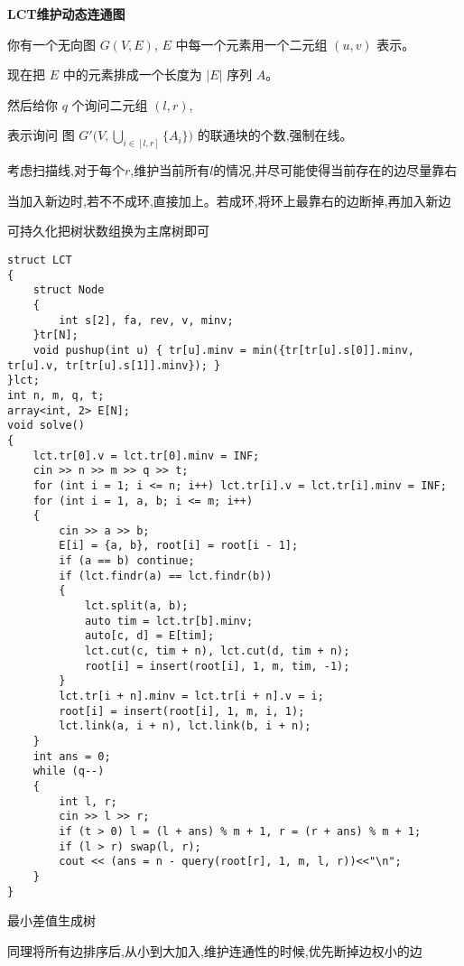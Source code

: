 \documentclass[a4paper,fontset=none]{ctexart}
\begin{document}
\textbf{LCT维护动态连通图}

你有一个无向图 $G( V, E )$, $E$ 中每一个元素用一个二元组 $( u, v )$ 表示。

现在把 $E$ 中的元素排成一个长度为 $|E|$ 序列 $A$。

然后给你 $q$ 个询问二元组 $( l, r )$,

表示询问 图 $ G'\big( V, \mathop{\bigcup}\limits_{ i \in [l, r] } \{A_i\} \big) $ 的联通块的个数,强制在线。

考虑扫描线,对于每个$r$,维护当前所有$l$的情况,并尽可能使得当前存在的边尽量靠右

当加入新边时,若不不成环,直接加上。若成环,将环上最靠右的边断掉,再加入新边

可持久化把树状数组换为主席树即可

\begin{verbatim}
struct LCT
{
    struct Node
    {
        int s[2], fa, rev, v, minv;
    }tr[N];
    void pushup(int u) { tr[u].minv = min({tr[tr[u].s[0]].minv, tr[u].v, tr[tr[u].s[1]].minv}); }
}lct;
int n, m, q, t;
array<int, 2> E[N];
void solve()
{
    lct.tr[0].v = lct.tr[0].minv = INF;
    cin >> n >> m >> q >> t;
    for (int i = 1; i <= n; i++) lct.tr[i].v = lct.tr[i].minv = INF;
    for (int i = 1, a, b; i <= m; i++)
    {
        cin >> a >> b;
        E[i] = {a, b}, root[i] = root[i - 1];
        if (a == b) continue;
        if (lct.findr(a) == lct.findr(b))
        {
            lct.split(a, b);
            auto tim = lct.tr[b].minv;
            auto[c, d] = E[tim];
            lct.cut(c, tim + n), lct.cut(d, tim + n);
            root[i] = insert(root[i], 1, m, tim, -1);
        }
        lct.tr[i + n].minv = lct.tr[i + n].v = i;
        root[i] = insert(root[i], 1, m, i, 1);
        lct.link(a, i + n), lct.link(b, i + n);
    }
    int ans = 0;
    while (q--)
    {
        int l, r;
        cin >> l >> r;
        if (t > 0) l = (l + ans) % m + 1, r = (r + ans) % m + 1;
        if (l > r) swap(l, r);
        cout << (ans = n - query(root[r], 1, m, l, r))<<"\n";
    }
}
\end{verbatim}

最小差值生成树

同理将所有边排序后,从小到大加入,维护连通性的时候,优先断掉边权小的边
\end{document}
